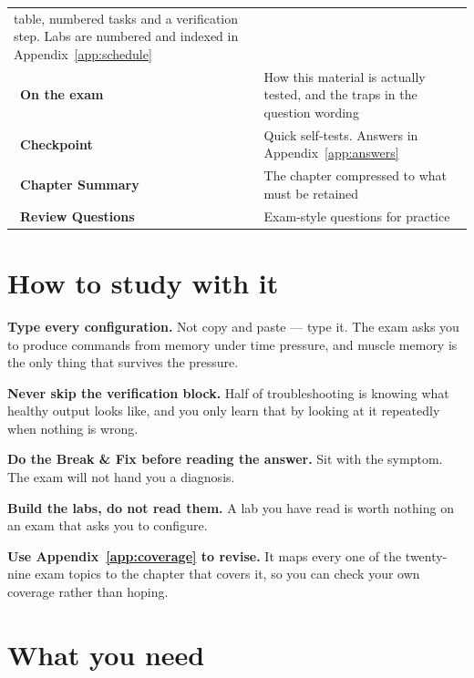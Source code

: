 \begin{longtable}{@{}L{4.6cm}L{10.8cm}@{}}
table, numbered tasks and a verification step. Labs are numbered and indexed in
Appendix~\ref{app:schedule} \\
~\textbf{On the exam} & How this material is actually
tested, and the traps in the question wording \\
~\textbf{Checkpoint} & Quick self-tests. Answers in
Appendix~\ref{app:answers} \\
~\textbf{Chapter Summary} & The chapter compressed to
what must be retained \\
~\textbf{Review Questions} & Exam-style questions for practice \\
\bottomrule
\end{longtable}

\section*{How to study with it}

\begin{tightnum}
  \item \textbf{Type every configuration.} Not copy and paste --- type it. The
        exam asks you to produce commands from memory under time pressure, and
        muscle memory is the only thing that survives the pressure.
  \item \textbf{Never skip the verification block.} Half of troubleshooting is
        knowing what healthy output looks like, and you only learn that by
        looking at it repeatedly when nothing is wrong.
  \item \textbf{Do the Break \& Fix before reading the answer.} Sit with the
        symptom. The exam will not hand you a diagnosis.
  \item \textbf{Build the labs, do not read them.} A lab you have read is worth
        nothing on an exam that asks you to configure.
  \item \textbf{Use Appendix~\ref{app:coverage} to revise.} It maps every one of
        the twenty-nine exam topics to the chapter that covers it, so you can
        check your own coverage rather than hoping.
\end{tightnum}

\section*{What you need}

